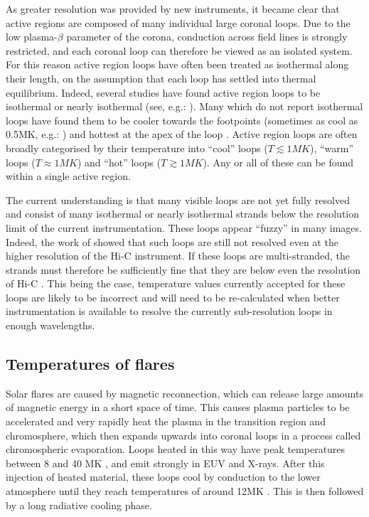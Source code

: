 \documentclass{article}
\begin{document}
As greater resolution was provided by new instruments, it became clear that active regions are composed of many individual large coronal loops.
Due to the low plasma-$\beta$ parameter of the corona, conduction across field lines is strongly restricted, and each coronal loop can therefore be viewed as an isolated system.
For this reason active region loops have often been treated as isothermal along their length, on the assumption that each loop has settled into thermal equilibrium.
Indeed, several studies have found active region loops to be isothermal or nearly isothermal (see, e.g.: \citet{Lenz1999,DelZanna2011,DelZanna2013}).
Many which do not report isothermal loops have found them to be cooler towards the footpoints (sometimes as cool as 0.5MK, e.g.: \citet{DelZanna2011}) and hottest at the apex of the loop \citep{Cheng1980,Aschwanden2000,DelZanna2003}.
Active region loops are often broadly categorised by their temperature into ``cool'' loops ($T\lesssim1MK$), ``warm'' loops ($T\approx1MK$) and ``hot'' loops ($T\gtrsim1MK$).
Any or all of these can be found within a single active region.

The current understanding is that many visible loops are not yet fully resolved and consist of many isothermal or nearly isothermal strands below the resolution limit of the current instrumentation.
These loops appear ``fuzzy'' in many images.
Indeed, the work of \citet{DelZanna2013} showed that such loops are still not resolved even at the higher resolution of the Hi-C instrument.
If these loops are multi-stranded, the strands must therefore be sufficiently fine that they are below even the resolution of Hi-C \citep{Cirtain2013}.
This being the case, temperature values currently accepted for these loops are likely to be incorrect and will need to be re-calculated when better instrumentation is available to resolve the currently sub-resolution loops in enough wavelengths.

\subsection{Temperatures of flares}
Solar flares are caused by magnetic reconnection, which can release large amounts of magnetic energy in a short space of time.
This causes plasma particles to be accelerated and very rapidly heat the plasma in the transition region and chromosphere, which then expands upwards into coronal loops \citep{Simoes2015} in a process called chromospheric evaporation.
Loops heated in this way have peak temperatures between 8 and 40 MK \citep{Ryan2013,Ryan2014}, and emit strongly in EUV and X-rays.
After this injection of heated material, these loops cool by conduction to the lower atmosphere until they reach temperatures of around 12MK \citep{Aschwanden2005}.
This is then followed by a long radiative cooling phase.
\end{document}
